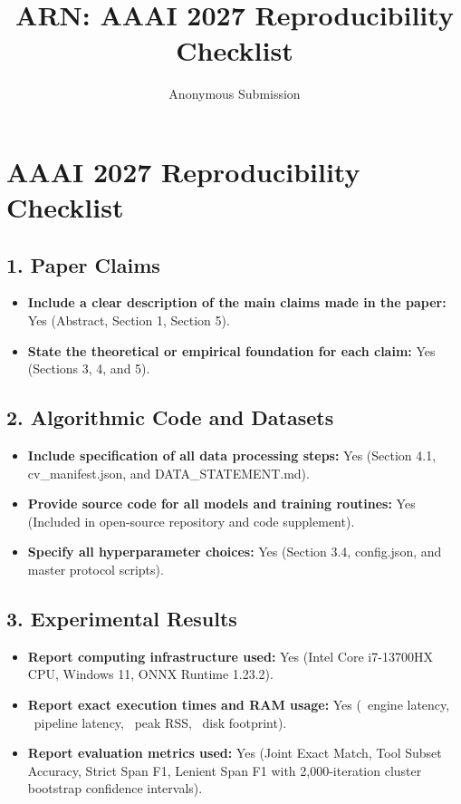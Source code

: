 \documentclass[letterpaper]{article}
\title{ARN: AAAI 2027 Reproducibility Checklist}
\author{Anonymous Submission}
\begin{document}
\maketitle

\section*{AAAI 2027 Reproducibility Checklist}

\subsection*{1. Paper Claims}
\begin{itemize}
    \item \textbf{Include a clear description of the main claims made in the paper:} Yes (Abstract, Section 1, Section 5).
    \item \textbf{State the theoretical or empirical foundation for each claim:} Yes (Sections 3, 4, and 5).
\end{itemize}

\subsection*{2. Algorithmic Code and Datasets}
\begin{itemize}
    \item \textbf{Include specification of all data processing steps:} Yes (Section 4.1, cv\_manifest.json, and DATA\_STATEMENT.md).
    \item \textbf{Provide source code for all models and training routines:} Yes (Included in open-source repository and code supplement).
    \item \textbf{Specify all hyperparameter choices:} Yes (Section 3.4, config.json, and master protocol scripts).
\end{itemize}

\subsection*{3. Experimental Results}
\begin{itemize}
    \item \textbf{Report computing infrastructure used:} Yes (Intel Core i7-13700HX CPU, Windows 11, ONNX Runtime 1.23.2).
    \item \textbf{Report exact execution times and RAM usage:} Yes (\ONNXINTOnetTLatencyMean\ engine latency, \PipelineFourTLatencyMean\ pipeline latency, \IsolatedPeakRSS\ peak RSS, \ModelSizeONNXINT\ disk footprint).
    \item \textbf{Report evaluation metrics used:} Yes (Joint Exact Match, Tool Subset Accuracy, Strict Span F1, Lenient Span F1 with 2,000-iteration cluster bootstrap confidence intervals).
\end{itemize}
\end{document}
